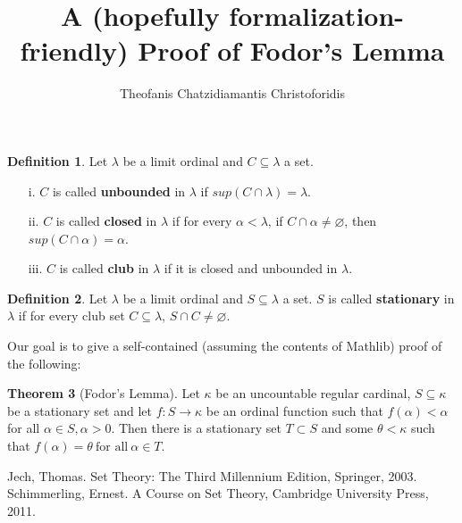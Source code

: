 \documentclass[11pt]{article}
\title{A (hopefully formalization-friendly) Proof of Fodor's Lemma}
\author{Theofanis Chatzidiamantis Christoforidis}
\date{}
\theoremstyle{definition}
\newtheorem{defin}{Definition}
\newtheorem{thm}[defin]{Theorem}
\begin{document}
\maketitle

\begin{defin}
    Let $\lambda$ be a limit ordinal and $C\subseteq \lambda$ a set.
    \begin{enumerate} \itemsep0.2em
        \item[i.]  $C$ is called \textbf{unbounded} in $\lambda$ if $sup(C\cap \lambda)=\lambda$.
        \item[ii.] $C$ is called \textbf{closed} in $\lambda$ if for every $\alpha < \lambda$,
        if $C\cap\alpha\neq\varnothing$, then $sup(C\cap\alpha)=\alpha$.
        \item[iii.] $C$ is called \textbf{club} in $\lambda$ if it is closed and unbounded
        in $\lambda$.
    \end{enumerate}
\end{defin}

\begin{defin}
    Let $\lambda$ be a limit ordinal and $S\subseteq \lambda$ a set. $S$ is called
    \textbf{stationary} in $\lambda$ if for every club set $C\subseteq\lambda$,
    $S\cap C\neq\varnothing$.
\end{defin}

Our goal is to give a self-contained (assuming the contents of Mathlib) proof of the following:

\begin{thm}[Fodor's Lemma]
   Let $\kappa$ be an uncountable regular cardinal, $S\subseteq\kappa$ be a
   stationary set and let $f:S\rightarrow \kappa$ be an ordinal function such
   that $f(\alpha)<\alpha$ for all $\alpha\in S, \alpha>0$. Then there is a
   stationary set $T\subset S$ and some $\theta <\kappa$ such that
   $f(\alpha)=\theta \ \text{for all} \ \alpha\in T.$
\end{thm}

\begin{thebibliography}{}
    \bibitem{} Jech, Thomas. Set Theory: The Third Millennium Edition, Springer, 2003.
    \bibitem{} Schimmerling, Ernest. A Course on Set Theory, Cambridge University Press, 2011.
\end{thebibliography}
\end{document}
